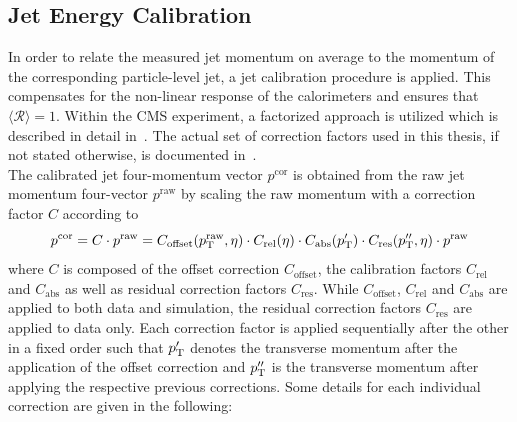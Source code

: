 \subsection{Jet Energy Calibration}
\label{subsec:jets_calib}
In order to relate the measured jet momentum on average to the momentum of the corresponding particle-level jet, a jet calibration procedure is applied. This compensates for the non-linear response of the calorimeters and ensures that $\langle \mathcal{R} \rangle = 1$. Within the CMS experiment, a factorized approach is utilized which is described in detail in~\cite{1748-0221-6-11-P11002}. The actual set of correction factors used in this thesis, if not stated otherwise, is documented in~\cite{CMS-DP-2013-033}. \\
The calibrated jet four-momentum vector $p^\mathrm{cor}$ is obtained from the raw jet momentum four-vector $p^\mathrm{raw}$ by scaling the raw momentum with a correction factor $C$ according to
\begin{equation}
p^\mathrm{cor} = C \cdot p^\mathrm{raw} = C_{\mathrm{offset}}(p_{\text{T}}^\mathrm{raw}, \eta) \cdot C_{\mathrm{rel}}(\eta) \cdot C_{\mathrm{abs}}(p_{\text{T}}') \cdot C_\mathrm{res}(p_{\text{T}}'', \eta) \cdot p^\mathrm{raw}
\end{equation} 
 where $C$ is composed of the offset correction $C_{\mathrm{offset}}$, the calibration factors $C_{\mathrm{rel}}$ and $C_{\mathrm{abs}}$ as well as residual correction factors $C_{\mathrm{res}}$. While $C_{\mathrm{offset}}$, $C_{\mathrm{rel}}$ and $C_{\mathrm{abs}}$ are applied to both data and simulation, the residual correction factors $C_{\mathrm{res}}$ are applied to data only. Each correction factor is applied sequentially after the other in a fixed order such that $p_{\text{T}}'$ denotes the transverse momentum after the application of the offset correction and $p_{\text{T}}''$ is the transverse momentum after applying the respective previous corrections. Some details for each individual correction are given in the following: 
